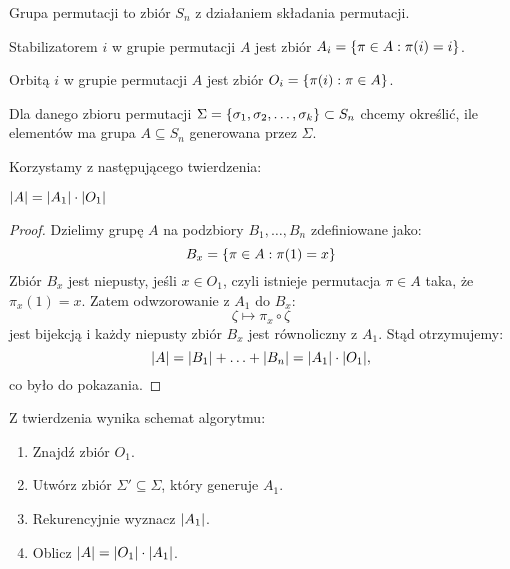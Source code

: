 \begin{definition}
    Grupa permutacji to zbiór \( S_n \) z działaniem składania permutacji.
\end{definition}

\begin{definition}
    Stabilizatorem \( i \) w grupie permutacji \( A \) jest zbiór \( A_i = \set{\pi \in A : \pi(i) = i} \).
\end{definition}

\begin{definition}
    Orbitą \( i \) w grupie permutacji \( A \) jest zbiór \(O_i = \set{\pi(i) : \pi \in A}\).
\end{definition}

Dla danego zbioru permutacji \(\Sigma = \set{\sigma_1, \sigma_2, \ldots, \sigma_k} \subset S_n\) chcemy określić, ile elementów ma grupa \(A \subseteq S_n\) generowana przez \(\Sigma\).

Korzystamy z następującego twierdzenia:
\begin{theorem}
    \( \left\lvert A\right\rvert = \left\lvert A_1\right\rvert \cdot \left\lvert O_1\right\rvert \)
\end{theorem}
\begin{proof}
    Dzielimy grupę \( A \) na podzbiory \( B_1, \ldots, B_n \) zdefiniowane jako:
    \[
        B_x = \set{\pi \in A : \pi(1) = x}
    \]
    Zbiór \( B_x \) jest niepusty, jeśli \( x \in O_1 \), czyli istnieje permutacja \( \pi \in A \) taka, że \(\pi_x(1) = x\).
    Zatem odwzorowanie z \( A_1 \) do \( B_x \):
    \[
        \zeta \mapsto \pi_x \circ \zeta
    \]
    jest bijekcją i każdy niepusty zbiór \( B_x \) jest równoliczny z \( A_1 \). Stąd otrzymujemy:
    \[
        \abs{A} = \abs{B_1} + \ldots + \abs{B_n} = \abs{A_1} \cdot \abs{O_1},
    \]
    co było do pokazania.
\end{proof}

Z twierdzenia wynika schemat algorytmu:
\begin{greyframe}
    \begin{enumerate}
        \item Znajdź zbiór \( O_1 \).
        \item Utwórz zbiór \( \Sigma' \subseteq \Sigma \), który generuje \( A_1 \).
        \item Rekurencyjnie wyznacz \(\left\lvert A_1\right\rvert\).
        \item Oblicz \(\left\lvert A\right\rvert = \left\lvert O_1\right\rvert \cdot \left\lvert A_1\right\rvert\).
    \end{enumerate}
\end{greyframe}

